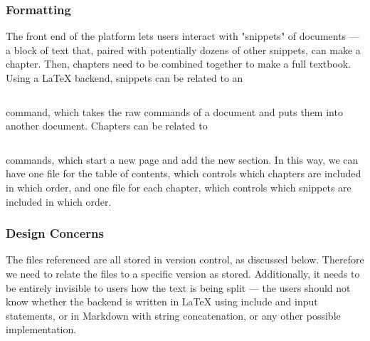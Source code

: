 \documentclass[letterpaper, 10pt, draftclsnofoot, compsoc, onecolumn]{IEEEtran}
\begin{document}
\subsubsection{Formatting}
The front end of the platform lets users interact with "snippets" of documents —
a block of text that, paired with potentially dozens of other snippets, can make
a chapter. Then, chapters need to be combined together to make a full textbook.
Using a LaTeX backend, snippets can be related to an \begin{verbatim}\end{verbatim} command, which takes
the raw commands of a document and puts them into another document. Chapters can
be related to \begin{verbatim}\end{verbatim} commands, which start a new page and add the new section.
In this way, we can have one file for the table of contents, which controls which
chapters are included in which order, and one file for each chapter, which controls
which snippets are included in which order.

{\noindent  \par}

\subsubsection{Design Concerns}
The files referenced are all stored in version control, as discussed below.
Therefore we need to relate the files to a specific version as stored. Additionally,
it needs to be entirely invisible to users how the text is being split — the users
should not know whether the backend is written in LaTeX using include and input
statements, or in Markdown with string concatenation, or any other possible
implementation.

{\noindent  \par}
\end{document}
